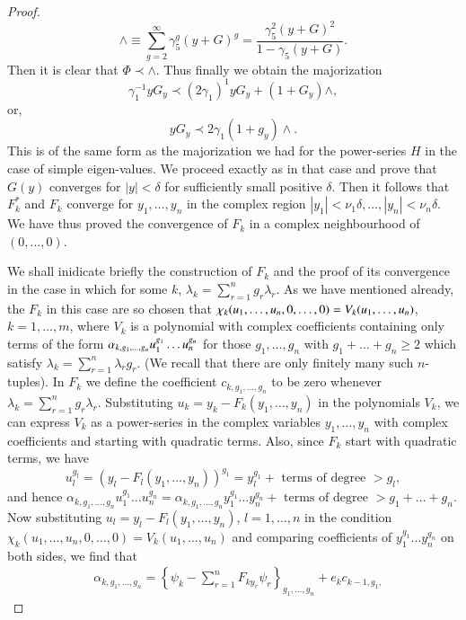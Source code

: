 \begin{proof}
$$
\wedge \equiv \sum\limits^\infty_{g=2} \gamma^g_5 (y+G)^g =
\frac{\gamma^2_5 (y+G)^2}{1-\gamma_5 (y+G)}. 
$$
Then it is clear that $\Phi \prec \wedge$. Thus finally we obtain the
majorization 
$$
\gamma^{-1}_1 y G_y \prec (2\gamma_1)^{1} y G_y + (1+ G_y)\wedge, 
$$
or,\pageoriginale
$$
y G_y \prec 2 \gamma_1(1+g_y) \wedge.
$$
This is of the same form as the majorization we had for the
power-series $H$ in the case of simple eigen-values. We proceed
exactly as in that case and prove that $G(y)$ converges for $|y| <
\delta$ for sufficiently small positive $\delta$. Then it follows that
$F^*_k$ and $F_k$ converge for $y_1, \ldots, y_n$ in the complex
region $|y_1| < \nu_1 \delta, \ldots, |y_n| < \nu_n \delta$. We have
thus proved the convergence of $F_k$ in a complex neighbourhood of
$(0, \ldots, 0)$. 

We shall inidicate briefly the construction of $F_k$ and the proof of
its convergence in the case in which for some $k$, $\lambda_k =
\sum\limits^n_{r=1} g_r \lambda_r$. As we have mentioned already, the
$F_k$ in this case are so chosen that $\chi_k (u_1, \ldots, u_n,\break 0,
\ldots,0) = V_k (u_1, \ldots, u_n)$, $k= 1, \ldots, m$, where $V_k$ is
a polynomial with complex coefficients containing only terms of the
form $\alpha_{k,g_1, \ldots, g_n} u^{g_1}_1 \ldots\break u^{g_n}_n$ for
those $g_1, \ldots, g_n$ with $g_1+ \ldots  + g_n \geq 2$  which
satisfy $\lambda_k = \sum\limits^n_{r=1} \lambda_r g_r$. (We recall
that there are only finitely many such $n$-tuples). In $F_k$ we define
the coefficient $c_{k,g_1, \ldots, g_n}$ to be zero whenever
$\lambda_k = \sum\limits^n_{r=1} g_r \lambda_r$. Substituting $u_k =
y_k - F_k (y_1, \ldots, y_n)$ in the polynomials $V_k$, we can express
$V_k$ as a power-series in the complex variables $y_1, \ldots, y_n$
with complex coefficients and starting with quadratic terms. Also,
since $F_k$ start with quadratic terms, we have 
$$ 
u^{g_l}_l = (y_l - F_l (y_1, \ldots, y_n))^{g_1} = y^{g_1}_l + \text{ terms of degree } > g_l,
$$\pageoriginale
and hence
$ 
\alpha_{k, g_1,\ldots, g_n} u^{g_1}_1 \ldots u^{g_n}_n = \alpha_{k,
  g_1, \ldots, g_n} y^{g_1}_1 \ldots y^{g_n}_n + \text{ terms of
  degree } > g_1 + \ldots + g_n$.
Now substituting $u_l = y_l - F_l (y_1, \ldots, y_n)$, $l=1, \ldots,n$
in the condition $\chi_k (u_1, \ldots, u_n, 0, \ldots, 0) =
V_k(u_1,\ldots, u_n)$ and comparing coefficients of $y^{g_1}_1 \ldots
y^{g_n}_n$ on both sides, we find that 
\begin{align*}
& \alpha_{k, g_1, \ldots, g_n} = \left\{ \psi_k - \sum\limits^n_{r=1}
  F_{ky_r} \psi_r\right\}_{g_1, \ldots, g_n} + e_k c_{k-1, g_1,
}
\end{align*}
\end{proof}
